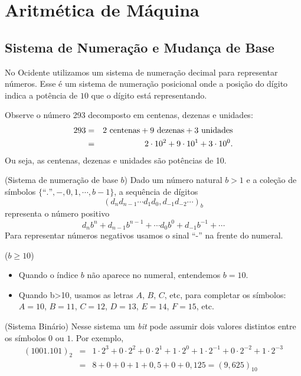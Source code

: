 \chapter{Aritmética de Máquina}
\section{Sistema de Numeração e Mudança de Base}
No Ocidente utilizamos um sistema de numeração decimal para representar números. Esse é um sistema de numeração posicional onde a posição do dígito indica a potência de $10$ que o dígito está representando.

\begin{ex}
  Observe o número 293 decomposto em centenas, dezenas e unidades:
  \begin{eqnarray*}
    293&=&2\ \hbox{centenas}+9\ \hbox{dezenas}+3\ \hbox{unidades}\\
    &=&2\cdot 10^2+9\cdot 10^1+3\cdot 10^0.
  \end{eqnarray*}
  Ou seja, as centenas, dezenas e unidades são potências de 10.
\end{ex}

\begin{defn}(Sistema de numeração de base $b$)
Dado um número natural $b>1$ e  a coleção de símbolos $\{\text{``.''}, - ,0, 1, \cdots, b-1\}$, a sequência de dígitos
$$
(d_nd_{n-1}\cdots d_1d_0,d_{-1}d_{-2}\cdots)_b
$$
representa o número positivo
$$
d_nb^n+d_{n-1}b^{n-1}+\cdots d_0b^0+d_{-1}b^{-1}+\cdots
$$
Para representar números negativos usamos o sinal ``-'' na frente do numeral.
\end{defn}

\begin{obs}($b\geq 10$)

\begin{itemize}
\item Quando o índice $b$ não aparece no numeral, entendemos $b=10$.
\item Quando b>10, usamos as letras $A$, $B$, $C$, etc, para completar os símbolos: $A=10$, $B=11$, $C=12$, $D=13$, $E=14$, $F=15$, etc.
\end{itemize}
\end{obs}


\begin{ex} (Sistema Binário)
Nesse sistema um \textit{bit} pode assumir dois valores distintos entre os símbolos $0$ ou $1$. Por exemplo,
\begin{eqnarray*}
(1001.101)_{2}&=&1\cdot 2^3 +0\cdot 2^2 +0\cdot 2^1 +1\cdot 2^0  +1\cdot 2^{-1} +0\cdot 2^{-2} +1\cdot 2^{-3} \\ &=&8+0+0+1+ 0,5+0+0,125=(9,625)_{10}
\end{eqnarray*}
\end{ex}


